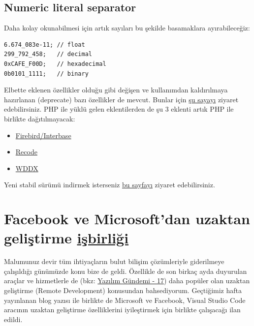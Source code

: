 \documentclass[11pt]{article}
\begin{document}
\subsection{Numeric literal separator}
\label{sec:org75d8c52}
Daha kolay okunabilmesi için artık sayıları bu şekilde basamaklara
ayırabileceğiz:
\begin{verbatim}
6.674_083e-11; // float
299_792_458;   // decimal
0xCAFE_F00D;   // hexadecimal
0b0101_1111;   // binary
\end{verbatim}

Elbette eklenen özellikler olduğu gibi değişen ve kullanımdan
kaldırılmaya hazırlanan (deprecate) bazı özellikler de mevcut. Bunlar için \href{https://www.php.net/manual/en/migration74.deprecated.php}{şu
sayayı} ziyaret edebilirsiniz. PHP ile yüklü gelen eklentilerden de şu 3
eklenti artık PHP ile birlikte dağıtılmayacak:
\begin{itemize}
\item \href{https://www.php.net/manual/en/book.ibase.php}{Firebird/Interbase}
\item \href{https://www.php.net/manual/en/book.recode.php}{Recode}
\item \href{https://www.php.net/manual/en/book.wddx.php}{WDDX}
\end{itemize}

Yeni stabil sürümü indirmek isterseniz \href{https://www.php.net/downloads.php}{bu sayfayı} ziyaret edebilirsiniz.
\section{Facebook ve Microsoft'dan uzaktan geliştirme \href{https://developers.facebook.com/blog/post/2019/11/19/facebook-microsoft-partnering-remote-development/}{işbirliği}}
\label{sec:org4df005e}
Malumunuz devir tüm ihtiyaçların bulut bilişim çözümleriyle giderilmeye
çalışıldığı günümüzde konu bize de geldi. Özellikle de son birkaç ayda
duyurulan araçlar ve hizmetlerle de (bkz: \href{../17/yazilim-gundemi-17.pdf}{Yazılım Gündemi - 17}) daha popüler
olan uzaktan geliştirme (Remote Development) konusundan bahsediyorum.
Geçtiğimiz hafta yayınlanan blog yazısı ile birlikte de Microsoft ve Facebook,
Visual Studio Code aracının uzaktan geliştirme özelliklerini iyileştirmek için
birlikte çalışacağı ilan edildi.
\end{document}

